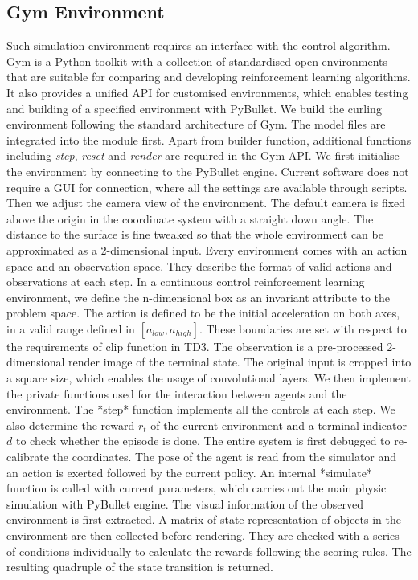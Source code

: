 \documentclass[oneside,11pt,a4paper]{article}
\begin{document}
\subsection{Gym Environment}
Such simulation environment requires an interface with the control algorithm. Gym is a Python toolkit with a collection of standardised open environments that are suitable for comparing and developing reinforcement learning algorithms. It also provides a unified API for customised environments, which enables testing and building of a specified environment with PyBullet. We build the curling environment following the standard architecture of Gym. The model files are integrated into the module first. Apart from builder function, additional functions including \textit{step}, \textit{reset} and \textit{render} are required in the Gym API.
\newline
\newline
\noindent
We first initialise the environment by connecting to the PyBullet engine. Current software does not require a GUI for connection, where all the settings are available through scripts. Then we adjust the camera view of the environment. The default camera is fixed above the origin in the coordinate system with a straight down angle. The distance to the surface is fine tweaked so that the whole environment can be approximated as a 2-dimensional input.
\newline
\newline
\noindent
Every environment comes with an action space and an observation space. They describe the format of valid actions and observations at each step. In a continuous control reinforcement learning environment, we define the n-dimensional box as an invariant attribute to the problem space. The action is defined to be the initial acceleration on both axes, in a valid range defined in $[a_{low}, a_{high}]$. These boundaries are set with respect to the requirements of clip function in TD3. The observation is a pre-processed 2-dimensional render image of the terminal state. The original input is cropped into a square size, which enables the usage of convolutional layers.
\newline
\newline
\noindent
We then implement the private functions used for the interaction between agents and the environment. The *step* function implements all the controls at each step. We also determine the reward $r_t$ of the current environment and a terminal indicator $d$ to check whether the episode is done. The entire system is first debugged to re-calibrate the coordinates. The pose of the agent is read from the simulator and an action is exerted followed by the current policy. An internal *simulate* function is called with current parameters, which carries out the main physic simulation with PyBullet engine. The visual information of the observed environment is first extracted. A matrix of state representation of objects in the environment are then collected before rendering. They are checked with a series of conditions individually to calculate the rewards following the scoring rules. The resulting quadruple of the state transition is returned.
\end{document}
